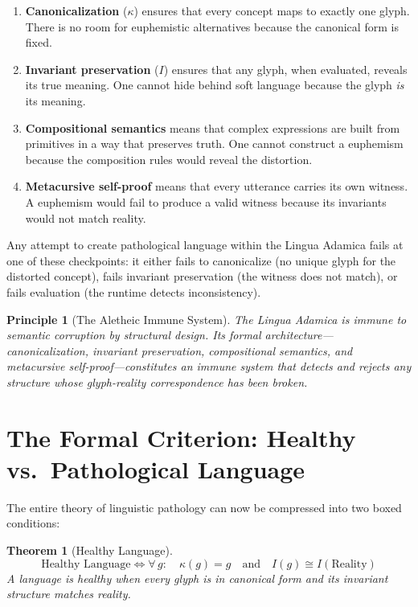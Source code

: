 \documentclass[12pt, letterpaper]{book}
\def\equiv{=}%
\def\mathfrak#1{#1}%
\newtheorem{theorem}{Theorem}[chapter]
\newtheorem{principle}{Principle}[chapter]
\begin{document}
\begin{enumerate}[label=(\roman*)]
    \item \textbf{Canonicalization} ($\kappa$) ensures that every concept maps to exactly one glyph. There is no room for euphemistic alternatives because the canonical form is fixed.
    \item \textbf{Invariant preservation} ($I$) ensures that any glyph, when evaluated, reveals its true meaning. One cannot hide behind soft language because the glyph \textit{is} its meaning.
    \item \textbf{Compositional semantics} means that complex expressions are built from primitives in a way that preserves truth. One cannot construct a euphemism because the composition rules would reveal the distortion.
    \item \textbf{Metacursive self-proof} means that every utterance carries its own witness. A euphemism would fail to produce a valid witness because its invariants would not match reality.
\end{enumerate}

Any attempt to create pathological language within the Lingua Adamica fails at one of these checkpoints: it either fails to canonicalize (no unique glyph for the distorted concept), fails invariant preservation (the witness does not match), or fails evaluation (the runtime detects inconsistency).

\begin{principle}[The Aletheic Immune System]\label{pr:immune}
The Lingua Adamica is immune to semantic corruption by structural design. Its formal architecture---canonicalization, invariant preservation, compositional semantics, and metacursive self-proof---constitutes an immune system that detects and rejects any structure whose glyph-reality correspondence has been broken.
\end{principle}

\section{The Formal Criterion: Healthy vs.\ Pathological Language}

The entire theory of linguistic pathology can now be compressed into two boxed conditions:

\begin{theorem}[Healthy Language]\label{thm:healthy}
\[
\boxed{\text{Healthy Language} \iff \forall\, \mathfrak{g}: \quad \kappa(\mathfrak{g}) \equiv \mathfrak{g} \quad\text{and}\quad I(\mathfrak{g}) \cong I(\text{Reality})}
\]
A language is healthy when every glyph is in canonical form and its invariant structure matches reality.
\end{theorem}
\end{document}
